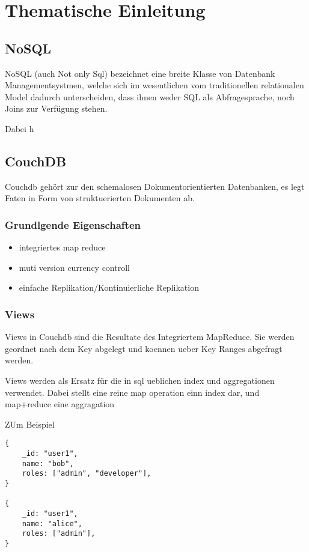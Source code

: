 \chapter{Thematische Einleitung}

\section{NoSQL}

NoSQL (auch Not only Sql) bezeichnet eine breite Klasse
von Datenbank Managementsystmen, welche sich im wesentlichen
vom traditionellen relationalen Model dadurch unterscheiden,
dass ihnen weder SQL als Abfragesprache, noch Joins zur Verfügung stehen.

Dabei h

\section{CouchDB}

Couchdb gehört zur den schemalosen Dokumentorientierten Datenbanken,
es legt Faten in Form von struktuerierten Dokumenten ab.

\subsection{Grundlgende Eigenschaften}

\begin{itemize}
\item integriertes map reduce
\item muti version currency controll
\item einfache Replikation/Kontinuierliche Replikation


\end{itemize}


\subsection{Views}

Views in Couchdb sind die Resultate des Integriertem MapReduce.
Sie werden geordnet nach dem Key abgelegt und koennen ueber Key Ranges abgefragt werden.


Views werden als Ersatz für die in sql ueblichen index und aggregationen verwendet.
Dabei stellt eine  reine map operation einn index dar, und map+reduce eine aggragation

ZUm Beispiel

\begin{lstlisting}
{
    _id: "user1",
    name: "bob",
    roles: ["admin", "developer"],
}

{
    _id: "user1",
    name: "alice",
    roles: ["admin"],
}
\end{lstlisting}



